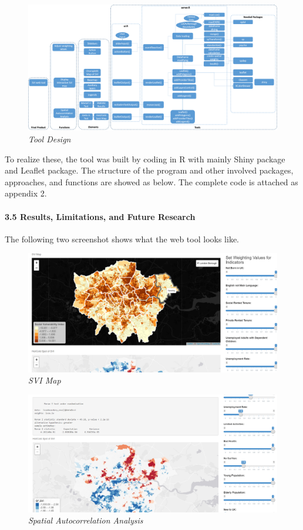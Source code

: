 \documentclass[]{article}
\let\oldparagraph\paragraph
\renewcommand{\paragraph}[1]{\oldparagraph{#1}\mbox{}}
\begin{document}
\begin{figure}
\centering
\includegraphics{Part3/pngs/ToolDesign.png}
\caption{\emph{Tool Design}}
\end{figure}

To realize these, the tool was built by coding in R with mainly Shiny
package and Leaflet package. The structure of the program and other
involved packages, approaches, and functions are showed as below. The
complete code is attached as appendix 2.

\paragraph{3.5 Results, Limitations, and Future
Research}\label{results-limitations-and-future-research}

The following two screenshot shows what the web tool looks like.

\begin{figure}
\centering
\includegraphics{Part3/pngs/finalproduct1.png}
\caption{\emph{SVI Map}}
\end{figure}

\begin{figure}
\centering
\includegraphics{Part3/pngs/finalproduct2.png}
\caption{\emph{Spatial Autocorrelation Analysis}}
\end{figure}
\end{document}
